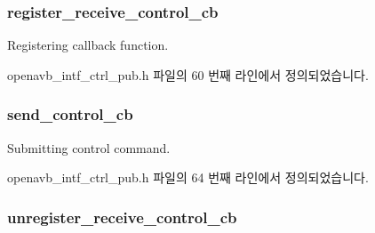\subsubsection[{\texorpdfstring{register\+\_\+receive\+\_\+control\+\_\+cb}{register_receive_control_cb}}]{ register\+\_\+receive\+\_\+control\+\_\+cb}\hypertarget{structopenavb__intf__host__cb__list__t_a5ccfdb0b676dc8830eac1eeca44a7f28}{}\label{structopenavb__intf__host__cb__list__t_a5ccfdb0b676dc8830eac1eeca44a7f28}


Registering callback function. 



openavb\+\_\+intf\+\_\+ctrl\+\_\+pub.\+h 파일의 60 번째 라인에서 정의되었습니다.

\subsubsection[{\texorpdfstring{send\+\_\+control\+\_\+cb}{send_control_cb}}]{ send\+\_\+control\+\_\+cb}\hypertarget{structopenavb__intf__host__cb__list__t_ac7b9a241fc9b4f279a63afa7b481c2aa}{}\label{structopenavb__intf__host__cb__list__t_ac7b9a241fc9b4f279a63afa7b481c2aa}


Submitting control command. 



openavb\+\_\+intf\+\_\+ctrl\+\_\+pub.\+h 파일의 64 번째 라인에서 정의되었습니다.

\subsubsection[{\texorpdfstring{unregister\+\_\+receive\+\_\+control\+\_\+cb}{unregister_receive_control_cb}}]{ unregister\+\_\+receive\+\_\+control\+\_\+cb}\hypertarget{structopenavb__intf__host__cb__list__t_a8ce2284ca4be905c7a121b776ba55ee6}{}\label{structopenavb__intf__host__cb__list__t_a8ce2284ca4be905c7a121b776ba55ee6}


